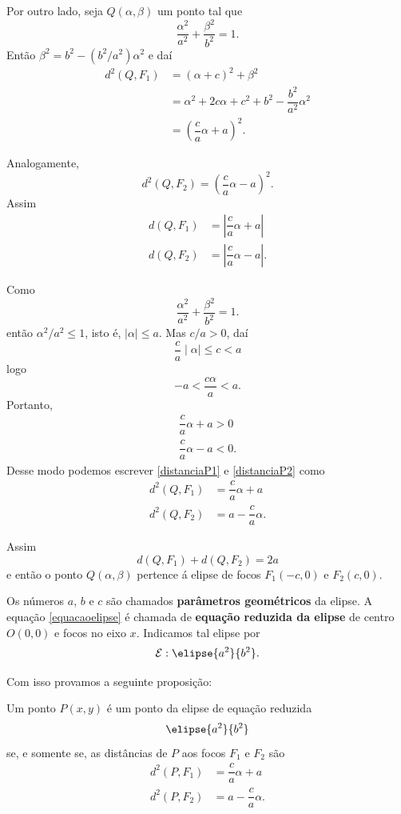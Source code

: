 Por outro lado, seja $Q(\alpha,\beta)$ um ponto tal que
\[
  \dfrac{\alpha^2}{a^2} + \dfrac{\beta^2}{b^2} = 1.
\]
Então $\beta^2 = b^2 - (b^2/a^2)\alpha^2$ e daí
\begin{align*}
  d^2(Q,F_1) &= (\alpha + c)^2 + \beta^2\\
&= \alpha^2 + 2c\alpha + c^2 + b^2 - \dfrac{b^2}{a^2}\alpha^2\\
&= \left(\dfrac{c}{a}\alpha + a\right)^2.
\end{align*}

Analogamente,
\begin{equation*}
  d^2(Q,F_2) = \left(\dfrac{c}{a}\alpha - a\right)^2.
\end{equation*}
Assim
\begin{align}
  d(Q,F_1) &= \left|\dfrac{c}{a}\alpha + a\right|\label{distanciaP1}\\
  d(Q,F_2) &= \left|\dfrac{c}{a}\alpha - a\right|\label{distanciaP2}.
\end{align}

Como
\[
  \dfrac{\alpha^2}{a^2} + \dfrac{\beta^2}{b^2} = 1.
\]
então $\alpha^2/a^2 \le 1$, isto é, $\mid\alpha\mid\le a$. Mas $c/a > 0$, daí
\[
  \dfrac{c}{a}\mid\alpha\mid \le c < a
\]
logo
\[
  -a < \dfrac{c\alpha}{a} < a.
\]
Portanto,
\begin{align*}
  \dfrac{c}{a}\alpha + a > 0\\
  \dfrac{c}{a}\alpha - a < 0.
\end{align*}
Desse modo podemos escrever \eqref{distanciaP1} e \eqref{distanciaP2} como
\begin{align*}
  d^2(Q,F_1) &= \dfrac{c}{a}\alpha + a\\
  d^2(Q,F_2) &= a - \dfrac{c}{a}\alpha.
\end{align*}

Assim
\[
  d(Q,F_1) + d(Q,F_2) = 2a
\]
e então o ponto $Q(\alpha,\beta)$ pertence á elipse de focos $F_1(-c,0)$ e $F_2(c,0)$.

Os n\'umeros $a$, $b$ e $c$ são chamados \textbf{parâmetros geométricos} da elipse. A equação \eqref{equacaoelipse} é chamada de \textbf{equação reduzida da elipse} de centro $O(0,0)$ e focos no eixo $x$. Indicamos tal elipse por 
\[
  \mathcal{E}: \elipse{a^2}{b^2}.
\]

Com isso provamos a seguinte proposição:
\begin{proposicao}
  Um ponto $P(x,y)$ é um ponto da elipse de equação reduzida
  \[
    \elipse{a^2}{b^2}
  \]
  se, e somente se, as distâncias de $P$ aos focos $F_1$ e $F_2$ são
  \begin{align*}
    d^2(P,F_1) &= \dfrac{c}{a}\alpha + a\\
    d^2(P,F_2) &= a - \dfrac{c}{a}\alpha.
  \end{align*}
\end{proposicao}

